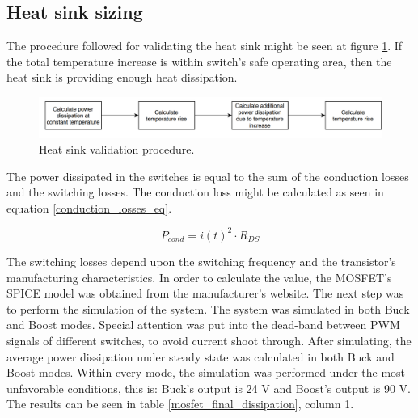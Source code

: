 \subsection{Heat sink sizing}

The procedure followed for validating the heat sink might be seen at figure \ref{heat_sink_validation_procedure}. If the total temperature increase is within switch's safe operating area, then the heat sink is providing enough heat dissipation.

\begin{figure}[htbp]
	\begin{center}
		\includegraphics[width=\textwidth]{../Pictures/P1/Component_sizing/heat_sink_validation_procedure.png}
		\caption{Heat sink validation procedure.}
		\label{heat_sink_validation_procedure}
	\end{center}	
\end{figure}

The power dissipated in the switches is equal to the sum of the conduction losses and the switching losses. The conduction loss might be calculated  as seen in equation \ref{conduction_losses_eq}.

\begin{equation} \label{conduction_losses_eq}
P_{cond} = i(t)^2 \cdot R_{DS}
\end{equation}

The switching losses depend upon the switching frequency and the transistor's manufacturing characteristics. In order to calculate the value, the MOSFET's SPICE model was obtained from the manufacturer's website. The next step was to perform the simulation of the system. The system was simulated in both Buck and Boost modes. Special attention was put into the dead-band between PWM signals of different switches, to avoid current shoot through. After simulating, the average power dissipation under steady state was calculated in both Buck and Boost modes. Within every mode, the simulation was performed under the most unfavorable conditions, this is: Buck's output is 24 V and Boost's output is 90 V. The results can be seen in table \ref{mosfet_final_dissipation}, column 1.

